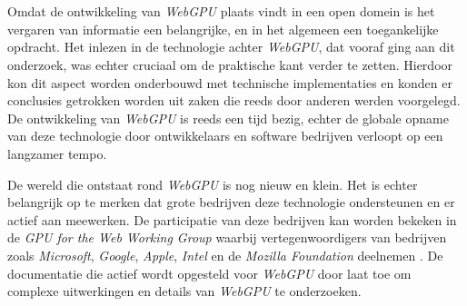 
\chapter{}%
\label{ch:methodologie}


Omdat de ontwikkeling van \textit{WebGPU} plaats vindt in een open domein is het vergaren van informatie een belangrijke, en in het algemeen een toegankelijke opdracht. Het inlezen in de technologie achter \textit{WebGPU}, dat vooraf ging aan dit onderzoek, was echter cruciaal om de praktische kant verder te zetten. Hierdoor kon dit aspect worden onderbouwd met technische implementaties en konden er conclusies getrokken worden uit zaken die reeds door anderen werden voorgelegd. De ontwikkeling van \textit{WebGPU} is reeds een tijd bezig, echter de globale opname van deze technologie door ontwikkelaars en software bedrijven verloopt op een langzamer tempo. 

\bigbreak{}

De wereld die ontstaat rond \textit{WebGPU} is nog nieuw en klein. Het is echter belangrijk op te merken dat grote bedrijven deze technologie ondersteunen en er actief aan meewerken. De participatie van deze bedrijven kan worden bekeken in de \textit{GPU for the Web Working Group} waarbij vertegenwoordigers van bedrijven zoals \textit{Microsoft}, \textit{Google}, \textit{Apple}, \textit{Intel} en de \textit{Mozilla Foundation} deelnemen \autocite{W3C2024a}. De documentatie die actief wordt opgesteld voor \textit{WebGPU} door \textcite{W3C2023} laat toe om complexe uitwerkingen en details van \textit{WebGPU} te onderzoeken. 

